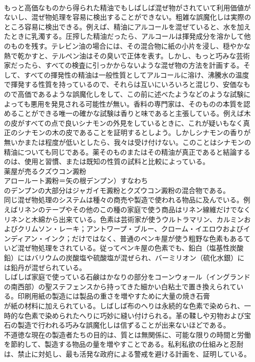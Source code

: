\documentclass[8pt]{extreport}
\begin{document}
\begin{CJK}{UTF8}{min}
\\	もっと高価なものから得られた精油でもしばしば混ぜ物がされていて利用価値がないし、混ぜ物処理を容易に検出することができない。粗雑な誤魔化しは実際のところ容易に検出できる。例えば、精油にアルコールを混ぜていると、水を加えたときに乳濁する。圧搾した精油だったら、アルコールは揮発成分を溶かして他のものを残す。テレビン油の場合には、その混合物に紙の小片を浸し、穏やかな熱で乾かすと、テルペン油はその臭いで正体を表す。しかし、もっと巧みな芸術家だったら、すべての検査に引っかからないような混ぜ物の方法を計画する。そして、すべての揮発性の精油は一般性質としてアルコールに溶け、沸騰水の温度で揮発する性質を持っているので、それらは互いにいろいろと混じり、安価なもので高価であるような誤魔化しをして、この前に述べたようなどのような試験によっても悪用を発見される可能性が無い。香料の専門家は、そのものの本質を認めることができる唯一の確かな試験は香りと味であると主張している。例えば木の皮がすべての点で良いシナモンの外見をしているときに、これが疑いもなく真正のシナモンの木の皮であることを証明するとしよう。しかしシナモンの香りが無いかまたは程度が低いとしたら、我々は受け付けない。このことはシナモンの精油についても同じである。薬そのものまたはその精油が真正であると結論するのは、使用と習慣、または既知の性質の試料と比較によっている。
\\	薬屋が売るクズウコン澱粉
\\	アロールート澱粉＝矢の根デンプン）すなわち 
\\	のデンプンの大部分はジャガイモ澱粉とクズウコン澱粉の混合物である。
\\	同じ混ぜ物処理のシステムは種々の商売や製造で使われる物品に及んでいる。例えばリネンのテープやその他のこの種の家庭で使う商品はリネン線維だけでなくリネンと木綿から出来ている。色素は芸術家が使うウルトラマリン、カルミンおよびクリムソン・レーキ；アントワープ・ブルー、クローム・イエロウおよびインディアン・インク；だけではなく、普通のペンキ屋が使う粗野な色素もあるていど混ぜ物処理をされている。従ってペンキ屋の色素でも、鉛白（塩基性炭酸鉛）にはバリウムの炭酸塩や硫酸塩が混ぜられ、バーミリオン（硫化水銀）には鉛丹が混ぜられている。
\\	しばしば家庭で使っている石鹸はかなりの部分をコーンウォール（イングランドの南西部）の聖ステフェンスから持ってきた細かい白粘土で置き換えられている。印刷用紙の製造には製品の重さを増やすために大量の焼き石膏
\\	が紙の材料に加えられている。しばしば布のへりは永続的な色素で染められ、一時的な色素で染められたへりに巧妙に縫い付けられる。革の鞣しや刃物および宝石の製造で行われる巧みな誤魔化しは信ずることが出来ないほどである。
\\	不道徳な現在の製造者たちの目的は、質とは無関係に、可能な限りの時間と労働を節約して、製造する物品の量を増やすことである。私利私欲の仕組みと忍耐は、禁止に対処し、最も活発な政府による警戒を避ける計画を、証明している。

\end{CJK}
\end{document}
